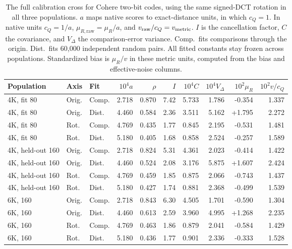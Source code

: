 \begin{table}[tbp]
\centering
\small
\setlength{\tabcolsep}{3.4pt}
\begin{tabular}{lllrrrrrrr}
\toprule
Population & Axis & Fit & $10^4a$ & $\rho$ & $I$ & $10^4C$ & $10^4V_\Delta$ & $10^2\mu_R$ & $10^2v/c_Q$ \\
\midrule
4K, fit 80 & Orig. & Comp. & 2.718 & 0.870 & 7.42 & 5.733 & 1.786 & -0.354 & 1.337 \\
4K, fit 80 & Orig. & Dist. & 4.460 & 0.584 & 2.36 & 3.511 & 5.162 & +1.795 & 2.272 \\
4K, fit 80 & Rot. & Comp. & 4.769 & 0.435 & 1.77 & 0.845 & 2.195 & -0.531 & 1.481 \\
4K, fit 80 & Rot. & Dist. & 5.180 & 0.405 & 1.68 & 0.858 & 2.524 & -0.257 & 1.589 \\
\midrule
4K, held-out 160 & Orig. & Comp. & 2.718 & 0.824 & 5.31 & 4.361 & 2.023 & -0.414 & 1.422 \\
4K, held-out 160 & Orig. & Dist. & 4.460 & 0.524 & 2.08 & 3.176 & 5.875 & +1.607 & 2.424 \\
4K, held-out 160 & Rot. & Comp. & 4.769 & 0.459 & 1.85 & 0.875 & 2.066 & -0.743 & 1.437 \\
4K, held-out 160 & Rot. & Dist. & 5.180 & 0.427 & 1.74 & 0.881 & 2.368 & -0.499 & 1.539 \\
\midrule
6K, 160 & Orig. & Comp. & 2.718 & 0.843 & 6.30 & 4.505 & 1.701 & -0.590 & 1.304 \\
6K, 160 & Orig. & Dist. & 4.460 & 0.613 & 2.59 & 3.960 & 4.995 & +1.268 & 2.235 \\
6K, 160 & Rot. & Comp. & 4.769 & 0.463 & 1.86 & 0.879 & 2.041 & -0.584 & 1.429 \\
6K, 160 & Rot. & Dist. & 5.180 & 0.436 & 1.77 & 0.901 & 2.336 & -0.333 & 1.528 \\
\bottomrule
\end{tabular}
\caption{The full calibration cross for Cohere two-bit codes, using the same signed-DCT rotation in all three populations. $a$ maps native scores to exact-distance units, in which $c_Q=1$. In native units $c_Q=1/a$, $\mu_{R,\mathrm{raw}}=\mu_R/a$, and $v_{\rm raw}/c_Q=v_{\rm metric}$. $I$ is the cancellation factor, $C$ the covariance, and $V_\Delta$ the comparison-error variance. Comp.\ fits comparisons through the origin. Dist.\ fits 60{,}000 independent random pairs. All fitted constants stay frozen across populations. Standardized bias is $\mu_R/v$ in these metric units, computed from the bias and effective-noise columns.}
\label{tab:app-crossed-calibration}
\end{table}

